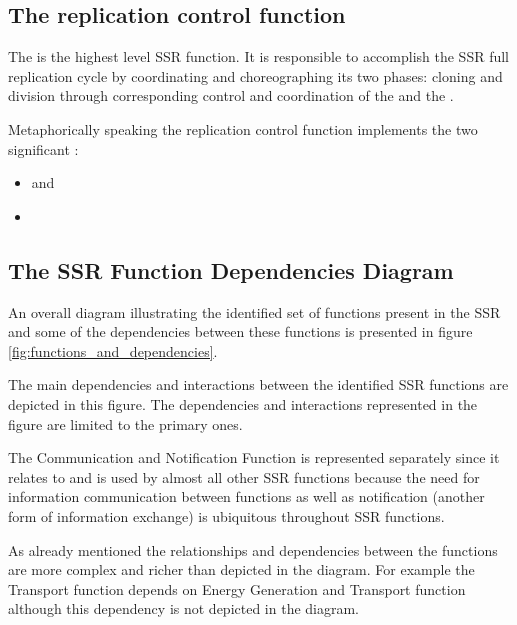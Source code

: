 \subsection[The replication control function]{The replication control
function}

The  is the highest level SSR function. It is responsible to
accomplish the SSR full replication cycle by coordinating and
choreographing its two phases: cloning and division through
corresponding control and coordination of the  
and the .

Metaphorically speaking the replication control function implements the
two significant :

\begin{itemize}
\item {} and
\item {}
\end{itemize}

\subsection[The SSR Function Dependencies Diagram]{The SSR Function
Dependencies Diagram}

An overall diagram illustrating
the identified set of functions present in the SSR and some of the
dependencies between these functions is presented in figure \ref{fig:functions_and_dependencies}.

The main dependencies and interactions between the identified SSR
functions are depicted in this figure. The dependencies and interactions
represented in the figure are limited to the primary ones.

The Communication and Notification Function is represented separately
since it relates to and is used by almost all other SSR functions
because the need for information communication between functions as
well as notification (another form of information exchange) is
ubiquitous throughout SSR functions.

As already mentioned the relationships and dependencies between the
functions are more complex and richer than depicted in the diagram. For
example the Transport function depends on Energy Generation and
Transport function although this dependency is not depicted in the
diagram.

